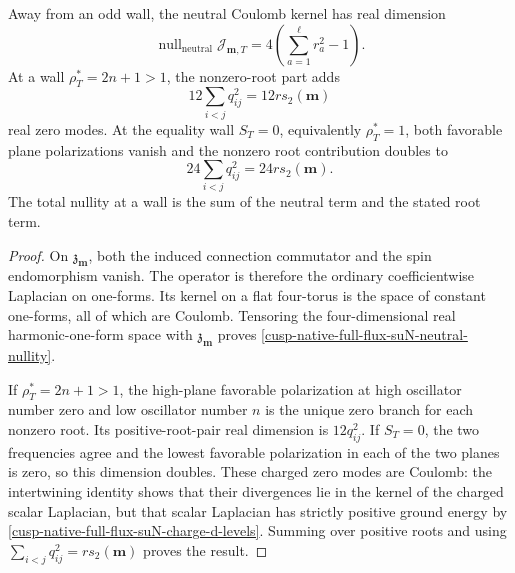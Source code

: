 \begin{theorem}
\label{cusp-native-full-flux-suN-nullity-theorem}
Away from an odd wall, the neutral Coulomb kernel has real dimension
\begin{equation}
 \operatorname{null}_{\mathrm{neutral}}\mathcal J_{\mathbf m,T}
 =4\left(\sum_{a=1}^{\ell}r_a^2-1\right).
 \label{cusp-native-full-flux-suN-neutral-nullity}
\end{equation}
At a wall \(\rho_T^*=2n+1>1\), the nonzero-root part adds
\begin{equation}
 12\sum_{i<j}q_{ij}^2=12r s_2(\mathbf m)
 \label{cusp-native-full-flux-suN-odd-wall-nullity}
\end{equation}
real zero modes.  At the equality wall \(S_T=0\), equivalently
\(\rho_T^*=1\), both favorable plane polarizations vanish and the nonzero
root contribution doubles to
\begin{equation}
 24\sum_{i<j}q_{ij}^2=24r s_2(\mathbf m).
 \label{cusp-native-full-flux-suN-equality-wall-nullity}
\end{equation}
The total nullity at a wall is the sum of the neutral term and the stated
root term.
\end{theorem}

\begin{proof}
On \(\mathfrak z_{\mathbf m}\), both the induced connection commutator and
the spin endomorphism vanish.  The operator is therefore the ordinary
coefficientwise Laplacian on one-forms.  Its kernel on a flat four-torus is
the space of constant one-forms, all of which are Coulomb.  Tensoring the
four-dimensional real harmonic-one-form space with
\(\mathfrak z_{\mathbf m}\) proves
\cref{cusp-native-full-flux-suN-neutral-nullity}.

If \(\rho_T^*=2n+1>1\), the high-plane favorable polarization at high
oscillator number zero and low oscillator number \(n\) is the unique zero
branch for each nonzero root.  Its positive-root-pair real dimension is
\(12q_{ij}^2\).  If \(S_T=0\), the two frequencies agree and the lowest
favorable polarization in each of the two planes is zero, so this dimension
doubles.  These charged zero modes are Coulomb: the intertwining identity
shows that their divergences lie in the kernel of the charged scalar
Laplacian, but that scalar Laplacian has strictly positive ground energy by
\cref{cusp-native-full-flux-suN-charge-d-levels}.  Summing over positive
roots and using
\(\sum_{i<j}q_{ij}^2=rs_2(\mathbf m)\) proves the result.
\end{proof}

